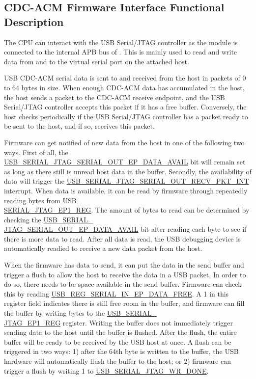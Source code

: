 \documentclass[main\_\_EN.tex]{subfiles}
\begin{document}
\subsection{CDC-ACM Firmware Interface Functional Description}

The CPU can interact with the USB Serial/JTAG controller as the module is connected to the internal APB bus of \chipname{}. This is mainly used to read and write data from and to the virtual serial port on the attached host.

USB CDC-ACM serial data is sent to and received from the host in packets of 0 to 64 bytes in size. When enough CDC-ACM data has accumulated in the host, the host sends a packet to the CDC-ACM receive endpoint, and the USB Serial/JTAG controller accepts this packet if it has a free buffer. Conversely, the host checks periodically if the USB Serial/JTAG controller has a packet ready to be sent to the host, and if so, receives this packet.

Firmware can get notified of new data from the host in one of the following two ways. First of all, the\\
\hyperref[fielddesc:USBSERIALJTAGSERIALOUTEPDATAAVAIL]{USB\_SERIAL\_JTAG\_SERIAL\_OUT\_EP\_DATA\_AVAIL}  bit  will remain set as long as there still is unread host data in the buffer. Secondly, the availability of data will trigger the  \hyperref[fielddesc:USBSERIALJTAGSERIALOUTRECVPKTINTRAW]{USB\_SERIAL\_JTAG\_SERIAL\_OUT\_RECV\_PKT\_INT} interrupt. When data is available, it can be read by firmware through repeatedly reading bytes from \hyperref[fielddesc:USBSERIALJTAGRDWRBYTE]{USB\_\\SERIAL\_JTAG\_EP1\_REG}. The amount of bytes to read can be determined by checking the
\hyperref[fielddesc:USBSERIALJTAGSERIALOUTEPDATAAVAIL]{USB\_SERIAL\_\\JTAG\_SERIAL\_OUT\_EP\_DATA\_AVAIL} bit after reading each byte to see if there is more data to read. After all data is read, the USB debugging device is automatically readied to receive a new data packet from the host.

When the firmware has data to send, it can put the data in the send buffer and trigger a flush to allow the host to receive the data in a USB packet. In order to do so, there needs to be space available in the send buffer. Firmware can check this by reading \hyperref[fielddesc:USBSERIALJTAGSERIALINEPDATAFREE]{USB\_REG\_SERIAL\_IN\_EP\_DATA\_FREE}. A 1 in this register field indicates there is still free room in the buffer, and firmware can fill the buffer by writing bytes to the \hyperref[fielddesc:USBSERIALJTAGRDWRBYTE]{USB\_SERIAL\_\\JTAG\_EP1\_REG} register. Writing the buffer does not immediately trigger sending data to the host until the buffer is flushed. After the flush, the entire buffer will be ready to be received by the USB host at once. A flush can be triggered in two ways: 1) after the 64th byte is written to the buffer, the USB hardware will automatically flush the buffer to the host; or 2) firmware can trigger a flush by writing 1 to \hyperref[fielddesc:USBSERIALJTAGWRDONE]{USB\_SERIAL\_JTAG\_WR\_DONE}.
\end{document}
